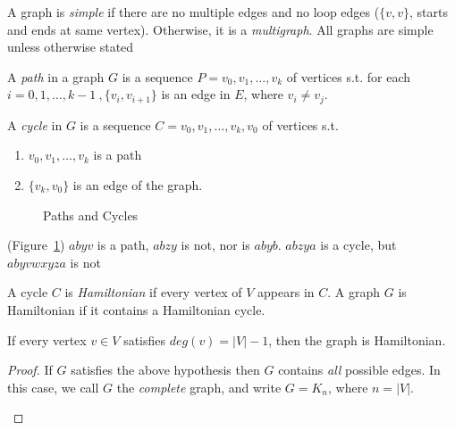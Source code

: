 \documentclass{article}
\begin{document}
\begin{defn}
A graph is \emph{simple} if there are no multiple edges and no loop edges ($\{v,v\}$, starts and ends at same vertex).  Otherwise, it is a \emph{multigraph}.  All graphs are simple unless otherwise stated
\end{defn}

\begin{defn}
A \emph{path} in a graph $G$ is a sequence $P=v_0,v_1,\ldots,v_k$ of vertices s.t. for each $i=0,1,\ldots,k-1 ~, \{v_i,v_{i+1}\}$ is an edge in $E$, where $v_i \neq v_j$.
\end{defn}



\begin{defn}
A \emph{cycle} in $G$ is a sequence $C=v_0,v_1,\ldots,v_k,v_0$ of vertices s.t.
\begin{enumerate}
 \item $v_0,v_1,\ldots,v_k$ is a path
\item $\{v_k,v_0\}$ is an edge of the graph.
\end{enumerate}
\end{defn}

\begin{examp}
\begin{figure}[H]
\centering
\caption{Paths and Cycles}
\label{fig:pathcyc}
\end{figure}
(Figure~\ref{fig:pathcyc}) $abyv$ is a path, $abzy$ is not, nor is $abyb$. $abzya$ is a cycle, but $abyvwxyza$ is not
\end{examp}

\begin{defn}
A cycle $C$ is \emph{Hamiltonian} if every vertex of $V$ appears in $C$.  A graph $G$ is Hamiltonian if it contains a Hamiltonian cycle.
\end{defn}

\begin{rem}
If every vertex $v \in V$ satisfies $deg(v)=|V|-1$, then the graph is Hamiltonian.
\end{rem}

\begin{proof}
If $G$ satisfies the above hypothesis then $G$ contains \emph{all} possible edges. In this case, we call $G$ the \emph{complete} graph, and write $G = K_n$, where $n=|V|$.

\begin{figure}[H]
 \centering

\end{figure}
\end{proof}
\end{document}

